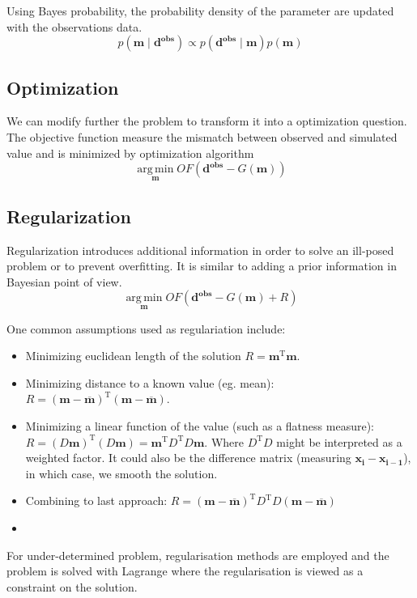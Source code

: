 \documentclass[twocolumn]{article}
\numberwithin{equation}{section}
\newcommand*\mean[1]{\overline{#1}}
\begin{document}
Using Bayes probability, the probability density of the parameter are updated with the observations data.
$$ p( \mathbf{m}\mid \mathbf{d^{obs}}) \propto p(\mathbf{d^{obs}} \mid \mathbf{m}) p(\mathbf{m})$$




	\subsection{Optimization}
We can modify further the problem to transform it into a optimization question. The objective function measure the mismatch between observed and simulated value and is minimized by optimization algorithm 
 $$\operatorname*{arg\,min}_\mathbf{m} OF( \mathbf{d^{obs}} - G(\mathbf{m}) )$$
 
 
 
 
	\subsection{Regularization}
Regularization introduces additional information in order to solve an ill-posed problem or to prevent overfitting. It is similar to adding a prior information in Bayesian point of view. 
 $$\operatorname*{arg\,min}_\mathbf{m} OF( \mathbf{d^{obs}} - G(\mathbf{m}) +R)$$

One common assumptions used as regulariation include:
\begin{itemize}
	\item Minimizing euclidean length of the solution $R=\mathbf{m}^\mathrm{T}\mathbf{m}$.
	\item Minimizing distance to a known value (eg. mean): $R=(\mathbf{m}-\mean{\mathbf{m}})^\mathrm{T}(\mathbf{m}-\mean{\mathbf{m}})$.
	\item Minimizing a linear function of the value (such as a flatness measure): $R=(D\mathbf{m})^\mathrm{T}(D\mathbf{m})=\mathbf{m}^\mathrm{T}D^\mathrm{T}D\mathbf{m}$. Where $D^\mathrm{T}D$ might be interpreted as a weighted factor. It could also be the difference matrix (measuring $\mathbf{x_i-x_{i-1}}$), in which case, we smooth the solution.
	\item Combining to last approach: $R=(\mathbf{m}-\mean{\mathbf{m}})^\mathrm{T}D^\mathrm{T}D(\mathbf{m}-\mean{\mathbf{m}})$
	\item 
\end{itemize}

For under-determined problem, regularisation methods are employed and the problem is solved with Lagrange where the regularisation is viewed as a constraint on the solution.
\end{document}
